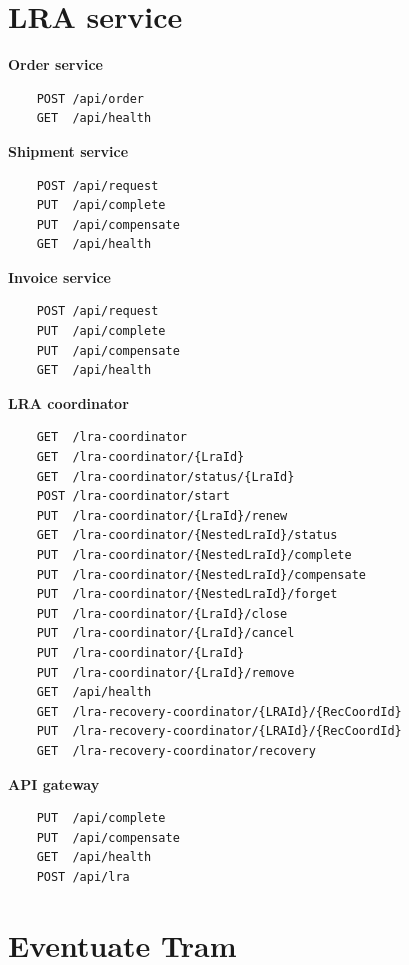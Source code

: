 \documentclass[oneside,
  digital, %
  table,   %
  nolof,     %
  nolot,     %
]{fithesis3}
\begin{document}
\section{LRA service}

\textbf{Order service}

\begin{verbatim}
    POST /api/order
    GET  /api/health
\end{verbatim}

\noindent
\textbf{Shipment service}

\begin{verbatim}
    POST /api/request
    PUT  /api/complete
    PUT  /api/compensate
    GET  /api/health
\end{verbatim}

\noindent
\textbf{Invoice service}

\begin{verbatim}
    POST /api/request
    PUT  /api/complete
    PUT  /api/compensate
    GET  /api/health
\end{verbatim}

\noindent
\textbf{LRA coordinator}

\begin{verbatim}
    GET  /lra-coordinator
    GET  /lra-coordinator/{LraId}
    GET  /lra-coordinator/status/{LraId}
    POST /lra-coordinator/start
    PUT  /lra-coordinator/{LraId}/renew
    GET  /lra-coordinator/{NestedLraId}/status
    PUT  /lra-coordinator/{NestedLraId}/complete
    PUT  /lra-coordinator/{NestedLraId}/compensate
    PUT  /lra-coordinator/{NestedLraId}/forget
    PUT  /lra-coordinator/{LraId}/close
    PUT  /lra-coordinator/{LraId}/cancel
    PUT  /lra-coordinator/{LraId}
    PUT  /lra-coordinator/{LraId}/remove
    GET  /api/health
    GET  /lra-recovery-coordinator/{LRAId}/{RecCoordId}
    PUT  /lra-recovery-coordinator/{LRAId}/{RecCoordId}
    GET  /lra-recovery-coordinator/recovery
\end{verbatim}

\noindent
\textbf{API gateway}

\begin{verbatim}
    PUT  /api/complete
    PUT  /api/compensate
    GET  /api/health
    POST /api/lra
\end{verbatim}


\section{Eventuate Tram}
\end{document}

